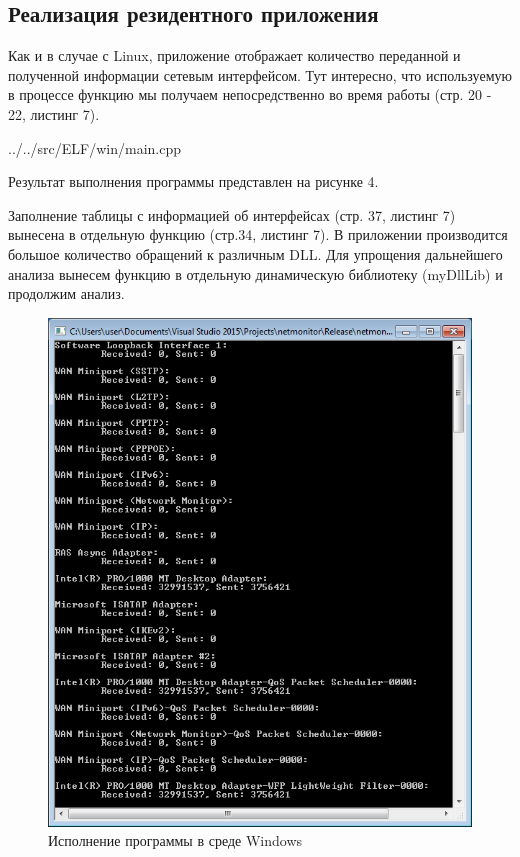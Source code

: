 \subsection{Реализация резидентного приложения}

Как и в случае с Linux, приложение отображает количество переданной и полученной информации сетевым интерфейсом. Тут интересно, что используемую в процессе функцию мы получаем непосредственно во время работы (стр. 20 - 22, листинг 7).


{../../src/ELF/win/main.cpp}

Результат выполнения программы представлен на рисунке 4.

Заполнение таблицы с информацией об интерфейсах (стр. 37, листинг 7) вынесена в отдельную функцию (стр.34, листинг 7). В приложении производится большое количество обращений к различным DLL. Для упрощения дальнейшего анализа вынесем функцию в отдельную динамическую библиотеку (myDllLib) и продолжим анализ.

\begin{figure}[H]
 \centering
 \includegraphics[scale=1]{res/win_004}
 \caption{Исполнение программы в среде Windows}
\end{figure}

